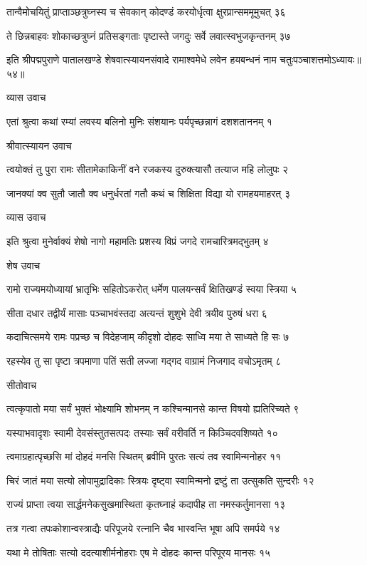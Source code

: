 तान्वैमोचयितुं प्राप्ताञ्छत्रुघ्नस्य च सेवकान्
कोदण्डं करयोर्धृत्वा क्षुरप्रान्सममूमुचत् ३६

ते छिन्नबाहवः शोकाच्छत्रुघ्नं प्रतिसङ्गताः
पृष्टास्ते जगदुः सर्वे लवात्स्वभुजकृन्तनम् ३७

इति श्रीपद्मपुराणे पातालखण्डे शेषवात्स्यायनसंवादे रामाश्वमेधे लवेन हयबन्धनं नाम चतुःपञ्चाशत्तमोऽध्यायः॥५४॥


व्यास उवाच

एतां श्रुत्वा कथां रम्यां लवस्य बलिनो मुनिः
संशयानः पर्यपृच्छन्नागं दशशताननम् १

श्रीवात्स्यायन उवाच

त्वयोक्तं तु पुरा रामः सीतामेकाकिनीं वने
रजकस्य दुरुक्त्यासौ तत्याज महि लोलुपः २

जानक्यां क्व सुतौ जातौ क्व धनुर्धरतां गतौ
कथं च शिक्षिता विद्या यो रामहयमाहरत् ३

व्यास उवाच

इति श्रुत्वा मुनेर्वाक्यं शेषो नागो महामतिः
प्रशस्य विप्रं जगदे रामचारित्रमद्भुतम् ४

शेष उवाच

रामो राज्यमयोध्यायां भ्रातृभिः सहितोऽकरोत्
धर्मेण पालयन्सर्वं क्षितिखण्डं स्वया स्त्रिया ५

सीता दधार तद्वीर्यं मासाः पञ्चाभवंस्तदा
अत्यन्तं शुशुभे देवी त्रयीव पुरुषं धरा ६

कदाचित्समये रामः पप्रच्छ च विदेहजाम्
कीदृशो दोहदः साध्वि मया ते साध्यते हि सः ७

रहस्येव तु सा पृष्टा त्रपमाणा पतिं सती
लज्जा गद्गद वाग्रामं निजगाद वचोऽमृतम् ८

सीतोवाच

त्वत्कृपातो मया सर्वं भुक्तं भोक्ष्यामि शोभनम्
न कश्चिन्मानसे कान्त विषयो ह्यतिरिच्यते ९

यस्याभवादृशः स्वामी देवसंस्तुतसत्पदः
तस्याः सर्वं वरीवर्ति न किञ्चिदवशिष्यते १०

त्वमाग्रहात्पृच्छसि मां दोहदं मनसि स्थितम्
ब्रवीमि पुरतः सत्यं तव स्वामिन्मनोहर ११

चिरं जातं मया सत्यो लोपामुद्रादिकाः स्त्रियः
दृष्ट्वा स्वामिन्मनो द्रष्टुं ता उत्सुकति सुन्दरीः १२

राज्यं प्राप्ता त्वया सार्द्धमनेकसुखमास्थिता
कृतघ्नाहं कदापीह ता नमस्कर्तुमानसा १३

तत्र गत्वा तपःकोशान्वस्त्राद्यैः परिपूजये
रत्नानि चैव भास्वन्ति भूषा अपि समर्पये १४

यथा मे तोषिताः सत्यो ददत्याशीर्मनोहराः
एष मे दोहदः कान्त परिपूरय मानसः १५

